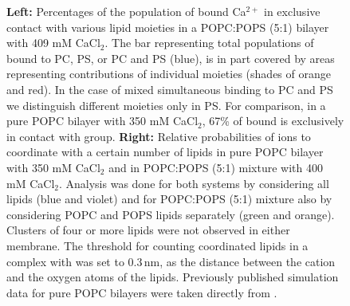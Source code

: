 \documentclass[journal=jpcbfk,manuscript=article]{achemso}
\begin{document}
\begin{figure}[tb!]
  \caption{ \label{fig:cacl_complexes} 
  \textbf{Left:} Percentages of the population of bound Ca$^{2+}$ 
in exclusive contact with various lipid moieties 
in a POPC:POPS (5:1) bilayer with 409 mM CaCl$_2$. 
The bar representing total populations of bound  to PC, PS, or PC and PS (blue),
is in part covered by areas representing contributions of individual moieties (shades of orange and red). 
In the case of mixed simultaneous binding to PC and PS
we distinguish different moieties only in PS.
For comparison, in a pure POPC bilayer with 350 mM CaCl$_2$, 
67\% of bound  is exclusively in contact with  group. \cite{melcr18} 
    \textbf{Right:} Relative probabilities of  ions to coordinate with a certain number of lipids
    in pure POPC bilayer with 350 mM CaCl$_2$ and in POPC:POPS (5:1) mixture with 400 mM CaCl$_2$.  
    Analysis was done for both systems by considering all lipids (blue and violet) and
    for POPC:POPS (5:1) mixture also by considering POPC and POPS lipids separately (green and orange). 
    Clusters of four or more lipids were not observed in either membrane.
    The threshold for counting coordinated lipids in a complex with  was set to $0.3\,\mathrm{nm}$, 
    as the distance between the cation and the oxygen atoms of the lipids. 
    Previously published simulation data \cite{melcr18} for pure POPC bilayers were taken directly from \cite{ECC-POPC_nacl_cacl2_files}. 
  }
\end{figure} 


\end{document}
